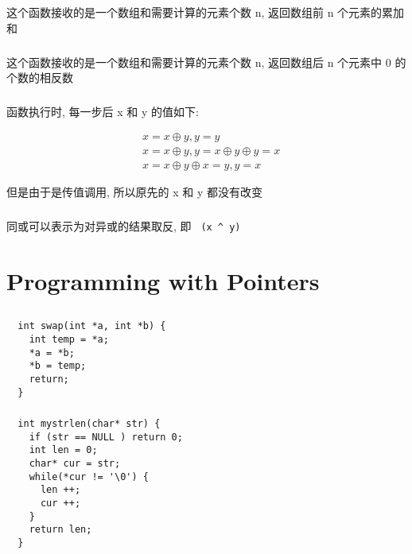 \documentclass[UTF8,nofonts]{ctexart}
\begin{document}
\subsection{}
\subsubsection{}
这个函数接收的是一个数组和需要计算的元素个数 n, 返回数组前 n 个元素的累加和

\subsubsection{}
这个函数接收的是一个数组和需要计算的元素个数 n, 返回数组后 n 个元素中 0 的个数的相反数

\subsubsection{}
函数执行时, 每一步后 x 和 y 的值如下:

\begin{align}
	 & x = x \oplus y, y = y                   \\
	 & x = x \oplus y, y = x\oplus y\oplus y=x \\
	 & x = x \oplus y \oplus x = y, y = x
\end{align}


但是由于是传值调用, 所以原先的 x 和 y 都没有改变

\subsubsection{}
同或可以表示为对异或的结果取反, 即 \texttt{~(x ^ y)}

\section{Programming with Pointers}
\subsection{}
\subsubsection{}
\begin{verbatim}
  int swap(int *a, int *b) {
    int temp = *a;
    *a = *b;
    *b = temp;
    return;
  }
\end{verbatim}

\subsubsection{}
\begin{verbatim}
  int mystrlen(char* str) {
    if (str == NULL ) return 0;
    int len = 0;
    char* cur = str;
    while(*cur != '\0') {
      len ++;
      cur ++;
    }
    return len;
  }
\end{verbatim}
\end{document}
